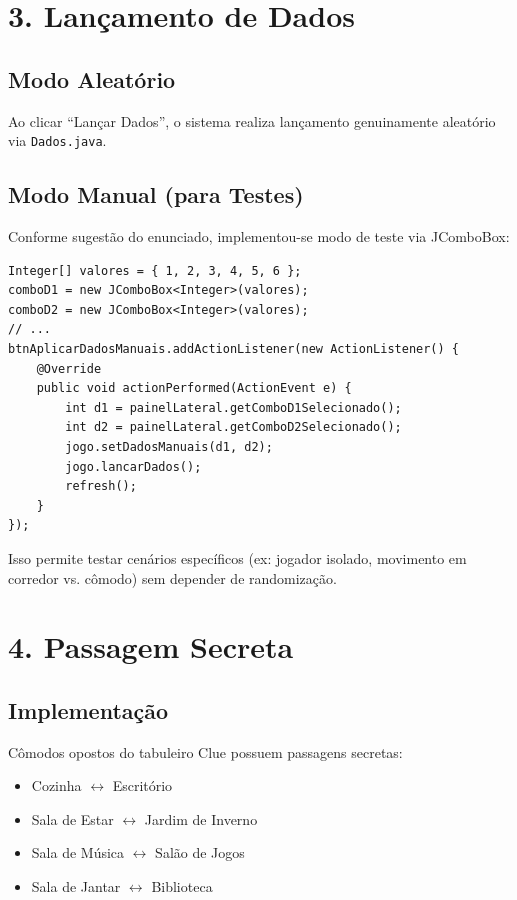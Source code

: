 \documentclass[12pt,a4paper]{report}
\begin{document}
\section{3. Lançamento de Dados}

\subsection{Modo Aleatório}

Ao clicar ``Lançar Dados'', o sistema realiza lançamento genuinamente aleatório via \texttt{Dados.java}.

\subsection{Modo Manual (para Testes)}

Conforme sugestão do enunciado, implementou-se modo de teste via JComboBox:

\begin{lstlisting}
Integer[] valores = { 1, 2, 3, 4, 5, 6 };
comboD1 = new JComboBox<Integer>(valores);
comboD2 = new JComboBox<Integer>(valores);
// ...
btnAplicarDadosManuais.addActionListener(new ActionListener() {
    @Override
    public void actionPerformed(ActionEvent e) {
        int d1 = painelLateral.getComboD1Selecionado();
        int d2 = painelLateral.getComboD2Selecionado();
        jogo.setDadosManuais(d1, d2);
        jogo.lancarDados();
        refresh();
    }
});
\end{lstlisting}

Isso permite testar cenários específicos (ex: jogador isolado, movimento em corredor vs. cômodo) sem depender de randomização.

\section{4. Passagem Secreta}

\subsection{Implementação}

Cômodos opostos do tabuleiro Clue possuem passagens secretas:
\begin{itemize}
    \item Cozinha $\leftrightarrow$ Escritório
    \item Sala de Estar $\leftrightarrow$ Jardim de Inverno
    \item Sala de Música $\leftrightarrow$ Salão de Jogos
    \item Sala de Jantar $\leftrightarrow$ Biblioteca
\end{itemize}
\end{document}
